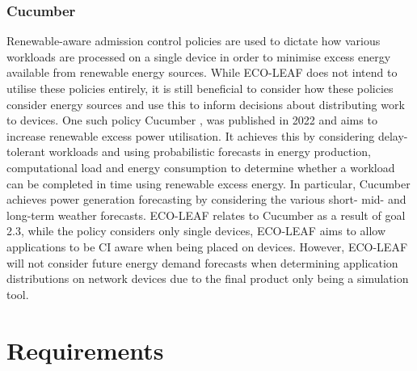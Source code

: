 \documentclass{l4proj}
\begin{document}
\subsection{Cucumber}
Renewable-aware admission control policies are used to dictate how various workloads are processed on a single device in order to minimise excess energy available from renewable energy sources.
While ECO-LEAF does not intend to utilise these policies entirely, it is still beneficial to consider how these policies consider energy sources and use this to inform decisions about distributing work to devices.
One such policy Cucumber \citep{cucumber}, was published in 2022 and aims to increase renewable excess power utilisation.
It achieves this by considering delay-tolerant workloads and using probabilistic forecasts in energy production, computational load and energy consumption to determine whether a workload can be completed in time using renewable excess energy.
In particular, Cucumber achieves power generation forecasting by considering the various short- mid- and long-term weather forecasts.
ECO-LEAF relates to Cucumber as a result of goal 2.3, while the policy considers only single devices, ECO-LEAF aims to allow applications to be CI aware when being placed on devices.
However, ECO-LEAF will not consider future energy demand forecasts when determining application distributions on network devices due to the final product only being a simulation tool.

\chapter{Requirements}\label{ch:analysis/requirements}
\end{document}
